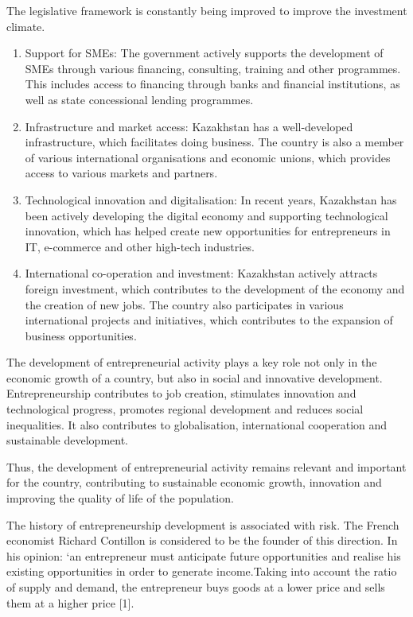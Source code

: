 \begin{multicols}{2}
The legislative framework is constantly being improved to improve the
investment climate.

\begin{enumerate}
\def\labelenumi{\arabic{enumi}.}
\setcounter{enumi}{1}
\item
  Support for SMEs: The government actively supports the development of
  SMEs through various financing, consulting, training and other
  programmes. This includes access to financing through banks and
  financial institutions, as well as state concessional lending
  programmes.
\item
  Infrastructure and market access: Kazakhstan has a well-developed
  infrastructure, which facilitates doing business. The country is also
  a member of various international organisations and economic unions,
  which provides access to various markets and partners.
\item
  Technological innovation and digitalisation: In recent years,
  Kazakhstan has been actively developing the digital economy and
  supporting technological innovation, which has helped create new
  opportunities for entrepreneurs in IT, e-commerce and other high-tech
  industries.
\item
  International co-operation and investment: Kazakhstan actively
  attracts foreign investment, which contributes to the development of
  the economy and the creation of new jobs. The country also
  participates in various international projects and initiatives, which
  contributes to the expansion of business opportunities.
\end{enumerate}

The development of entrepreneurial activity plays a key role not only in
the economic growth of a country, but also in social and innovative
development. Entrepreneurship contributes to job creation, stimulates
innovation and technological progress, promotes regional development and
reduces social inequalities. It also contributes to globalisation,
international cooperation and sustainable development.

Thus, the development of entrepreneurial activity remains relevant and
important for the country, contributing to sustainable economic growth,
innovation and improving the quality of life of the population.

The history of entrepreneurship development is associated with risk. The
French economist Richard Contillon is considered to be the founder of
this direction. In his opinion: `an entrepreneur must anticipate future
opportunities and realise his existing opportunities in order to
generate income.Taking into account the ratio of supply and demand, the
entrepreneur buys goods at a lower price and sells them at a higher
price {[}1{]}.


\end{multicols}
